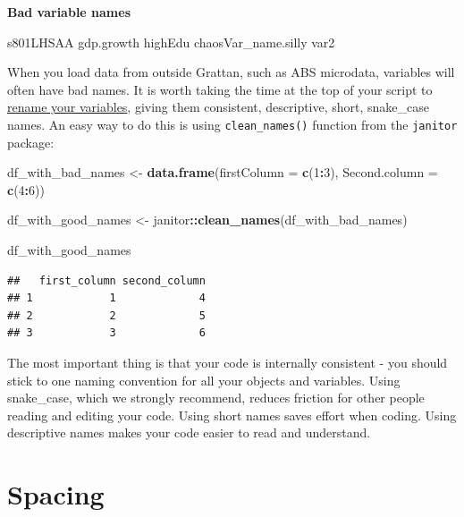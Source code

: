 \documentclass[]{book}
\newenvironment{Shaded}{\begin{snugshade}}{\end{snugshade}}
\newcommand{\DataTypeTok}[1]{\textcolor[rgb]{0.13,0.29,0.53}{#1}}
\newcommand{\DecValTok}[1]{\textcolor[rgb]{0.00,0.00,0.81}{#1}}
\newcommand{\KeywordTok}[1]{\textcolor[rgb]{0.13,0.29,0.53}{\textbf{#1}}}
\newcommand{\NormalTok}[1]{#1}
\newcommand{\OperatorTok}[1]{\textcolor[rgb]{0.81,0.36,0.00}{\textbf{#1}}}
\newcommand{\StringTok}[1]{\textcolor[rgb]{0.31,0.60,0.02}{#1}}
\begin{document}
\textbf{Bad variable names}

\begin{Shaded}
\begin{Highlighting}[]
\NormalTok{s801LHSAA}
\NormalTok{gdp.growth}
\NormalTok{highEdu}
\NormalTok{chaosVar_name.silly}
\NormalTok{var2}
\end{Highlighting}
\end{Shaded}

When you load data from outside Grattan, such as ABS microdata, variables will often have bad names. It is worth taking the time at the top of your script to \href{https://dplyr.tidyverse.org/reference/select.html}{rename your variables}, giving them consistent, descriptive, short, snake\_case names. An easy way to do this is using \texttt{clean\_names()} function from the \texttt{janitor} package:

\begin{Shaded}
\begin{Highlighting}[]
\NormalTok{df_with_bad_names <-}\StringTok{ }\KeywordTok{data.frame}\NormalTok{(}\DataTypeTok{firstColumn =} \KeywordTok{c}\NormalTok{(}\DecValTok{1}\OperatorTok{:}\DecValTok{3}\NormalTok{),}
                                \DataTypeTok{Second.column =} \KeywordTok{c}\NormalTok{(}\DecValTok{4}\OperatorTok{:}\DecValTok{6}\NormalTok{))}

\NormalTok{df_with_good_names <-}\StringTok{ }\NormalTok{janitor}\OperatorTok{::}\KeywordTok{clean_names}\NormalTok{(df_with_bad_names)}

\NormalTok{df_with_good_names}
\end{Highlighting}
\end{Shaded}

\begin{verbatim}
##   first_column second_column
## 1            1             4
## 2            2             5
## 3            3             6
\end{verbatim}

The most important thing is that your code is internally consistent - you should stick to one naming convention for all your objects and variables. Using snake\_case, which we strongly recommend, reduces friction for other people reading and editing your code. Using short names saves effort when coding. Using descriptive names makes your code easier to read and understand.

\hypertarget{spacing}{%
\section{Spacing}\label{spacing}}
\end{document}
